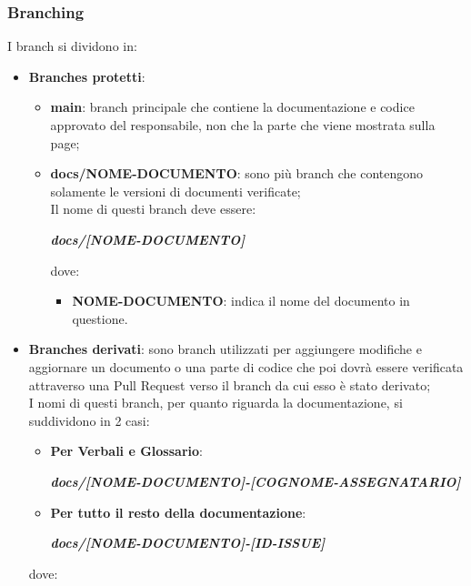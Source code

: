         \subsubsection{Branching}\label{inf:branch}
        I branch si dividono in:
        \begin{itemize}
            \item \textbf{Branches protetti}: 
            \begin{itemize}
                \item \textbf{main}: branch principale che contiene la documentazione e codice approvato del responsabile, non che la parte che viene mostrata sulla page;
                \item \textbf{docs/NOME-DOCUMENTO}: sono più branch che contengono solamente le versioni di documenti verificate;\\
                Il nome di questi branch deve essere:
                \begin{center}
                    \textbf{\textit{docs/[NOME-DOCUMENTO]}}
                \end{center}
                dove:
                \begin{itemize}
                    \item \textbf{NOME-DOCUMENTO}: indica il nome del documento in questione.
                \end{itemize}
            \end{itemize}
            \item \textbf{Branches derivati}: sono branch utilizzati per aggiungere modifiche e aggiornare un documento o una parte di codice che poi dovrà essere verificata
            attraverso una Pull Request verso il branch da cui esso è stato derivato;\\
            I nomi di questi branch, per quanto riguarda la documentazione, si suddividono in 2 casi:
            \begin{itemize}
                \item \textbf{Per Verbali e Glossario}:
                \begin{center}
                    \textbf{\textit{docs/[NOME-DOCUMENTO]-[COGNOME-ASSEGNATARIO]}}
                \end{center}
                \item \textbf{Per tutto il resto della documentazione}:
                \begin{center}
                    \textbf{\textit{docs/[NOME-DOCUMENTO]-[ID-ISSUE]}}
                \end{center}
            \end{itemize}
            dove:
    

\end{itemize}
